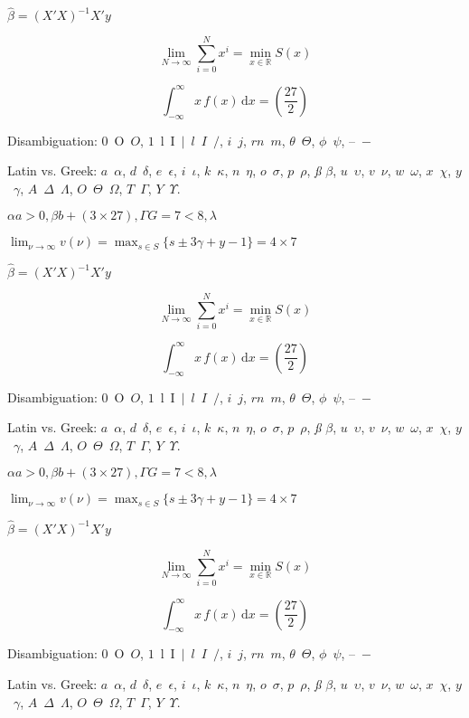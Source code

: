 \documentclass[12pt, a4paper, oneside]{article}
\newcommand{\mathup}[1]{\mathrm{#1}}
\theoremstyle{Plain}
\theoremstyle{Definition}
\theoremstyle{Remark}
\begin{document}
\begin{appendix}
$\hat{\beta} = (X'X)^{-1}X'y$

$$\lim_{N \to \infty} \sum_{i=0}^{N} x^i = \min_{x \in \mathbb{R}} S(x)$$

$$\int_{-\infty}^{\infty} x\,f(x)\,\mathup{d}x = \left( \frac{27}{2} \right)$$

Disambiguation: $0$~O~$O$, $1$~l~I~$|$~$l$~$I$~$/$, $i$~$j$, $rn$~$m$, $\theta$~$\Theta$, $\phi$~$\psi$, --~$-$

Latin vs. Greek: $a$~$\alpha$, $d$~$\delta$, $e$~$\epsilon$, $i$~$\iota$, $k$~$\kappa$, $n$~$\eta$, $o$~$\sigma$, $p$~$\rho$, \textit{\ss} $\beta$, $u$~$\upsilon$, $v$~$\nu$, $w$~$\omega$, $x$~$\chi$, $y$~$\gamma$, $A$~$\Delta$~$\Lambda$, $O$~$\Theta$~$\Omega$, $T$~$\Gamma$, $Y$~$\Upsilon$.

\noindent%
{\bfseries%
$\alpha a > 0, \beta b + (3 \times 27), \Gamma G = 7 < 8, \lambda$

$\lim_{\nu \to \infty} v(\nu) = \max_{s \in S} \{s \pm 3 \gamma + y - 1\} = 4 \times 7$

$\hat{\beta} = (X'X)^{-1}X'y$

$$\lim_{N \to \infty} \sum_{i=0}^{N} x^i = \min_{x \in \mathbb{R}} S(x)$$

$$\int_{-\infty}^{\infty} x\,f(x)\,\mathup{d}x = \left( \frac{27}{2} \right)$$

Disambiguation: $0$~O~$O$, $1$~l~I~$|$~$l$~$I$~$/$, $i$~$j$, $rn$~$m$, $\theta$~$\Theta$, $\phi$~$\psi$, --~$-$

Latin vs. Greek: $a$~$\alpha$, $d$~$\delta$, $e$~$\epsilon$, $i$~$\iota$, $k$~$\kappa$, $n$~$\eta$, $o$~$\sigma$, $p$~$\rho$, \textit{\ss} $\beta$, $u$~$\upsilon$, $v$~$\nu$, $w$~$\omega$, $x$~$\chi$, $y$~$\gamma$, $A$~$\Delta$~$\Lambda$, $O$~$\Theta$~$\Omega$, $T$~$\Gamma$, $Y$~$\Upsilon$.
}

\noindent%
{\sffamily%
$\alpha a > 0, \beta b + (3 \times 27), \Gamma G = 7 < 8, \lambda$

$\lim_{\nu \to \infty} v(\nu) = \max_{s \in S} \{s \pm 3 \gamma + y - 1\} = 4 \times 7$

$\hat{\beta} = (X'X)^{-1}X'y$

$$\lim_{N \to \infty} \sum_{i=0}^{N} x^i = \min_{x \in \mathbb{R}} S(x)$$

$$\int_{-\infty}^{\infty} x\,f(x)\,\mathup{d}x = \left( \frac{27}{2} \right)$$

Disambiguation: $0$~O~$O$, $1$~l~I~$|$~$l$~$I$~$/$, $i$~$j$, $rn$~$m$, $\theta$~$\Theta$, $\phi$~$\psi$, --~$-$

Latin vs. Greek: $a$~$\alpha$, $d$~$\delta$, $e$~$\epsilon$, $i$~$\iota$, $k$~$\kappa$, $n$~$\eta$, $o$~$\sigma$, $p$~$\rho$, \textit{\ss} $\beta$, $u$~$\upsilon$, $v$~$\nu$, $w$~$\omega$, $x$~$\chi$, $y$~$\gamma$, $A$~$\Delta$~$\Lambda$, $O$~$\Theta$~$\Omega$, $T$~$\Gamma$, $Y$~$\Upsilon$.
}


\end{appendix}
\end{document}
